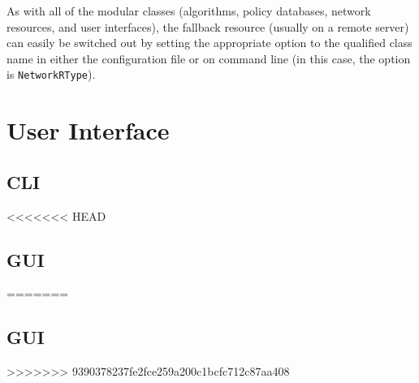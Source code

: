 As with all of the modular classes (algorithms, policy databases, network resources, and user interfaces), the fallback resource (usually on a remote server) can easily be switched out by setting the appropriate  option to the qualified class name in either the configuration file or on command line (in this case, the option is \texttt{NetworkRType}).

\section{User Interface} %

\subsection{CLI}%

<<<<<<< HEAD
\subsection{GUI}
=======
\subsection{GUI}%
>>>>>>> 9390378237fe2fce259a200c1bcfc712c87aa408
